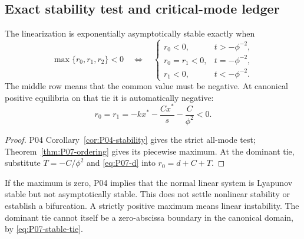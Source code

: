 \subsection{Exact stability test and critical-mode ledger}
\begin{corollary}
\label{cor:P07-stability}
The linearization is exponentially asymptotically stable exactly when
\begin{equation}
 \max\{r_0,r_1,r_2\}<0
 \quad\Longleftrightarrow\quad
 \begin{cases}
 r_0<0,&t>-\phi^{-2},\\
 r_0=r_1<0,&t=-\phi^{-2},\\
 r_1<0,&t<-\phi^{-2}.
 \end{cases}
 \label{eq:P07-stability}
\end{equation}
The middle row means that the common value must be negative. At canonical
positive equilibria on that tie it is automatically negative:
\begin{equation}
 r_0=r_1=-kx^*-\frac{Cx^*}{s}-\frac{C}{\phi^2}<0.
 \label{eq:P07-stable-tie}
\end{equation}
\end{corollary}
\begin{proof}
P04 Corollary~\ref{cor:P04-stability} gives the strict all-mode test;
Theorem~\ref{thm:P07-ordering} gives its piecewise maximum.
At the dominant tie, substitute $T=-C/\phi^2$ and
\eqref{eq:P07-d} into $r_0=d+C+T$.
\end{proof}
If the maximum is zero, P04 implies that the normal linear system is
Lyapunov stable but not asymptotically stable. This does not settle
nonlinear stability or establish a bifurcation. A strictly positive
maximum means linear instability. The dominant tie cannot itself be a
zero-abscissa boundary in the canonical domain, by
\eqref{eq:P07-stable-tie}.

